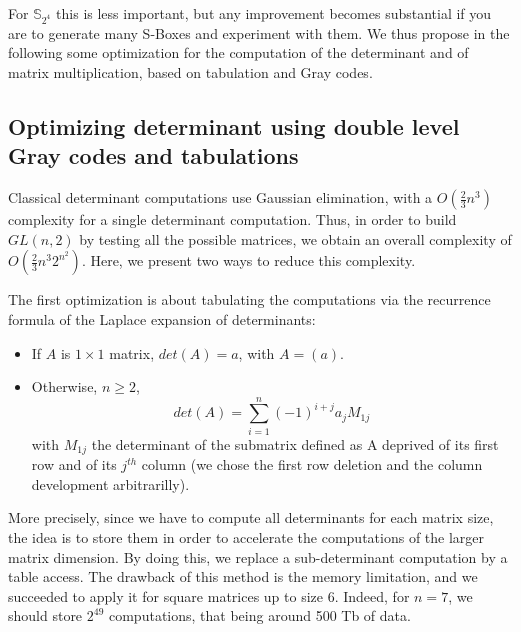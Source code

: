 \documentclass{article}\usepackage{amsthm}
\newcommand{\Sf}{{\mathbb S}}
\newcommand{\SBoxes}{S-Boxes\xspace}
\begin{document}
For $\Sf_{2^4}$ this is less important, but any improvement becomes substantial
if you are to generate many \SBoxes and experiment with them. We thus propose in
the following some optimization for the computation of the determinant and of
matrix multiplication, based on tabulation and Gray codes. 

\subsection{Optimizing determinant using double level Gray codes and tabulations}
Classical determinant computations use Gaussian elimination, with a $O(\frac{2}{3}n^3)$ complexity for a single determinant computation. 
Thus, in order to build $GL(n,2)$ by testing all the possible matrices, we obtain an overall complexity of $O(\frac{2}{3}n^3 2^{n^2})$. 
Here, we present two ways to reduce this complexity.

The first optimization is about tabulating the computations via the recurrence
formula of the Laplace expansion of determinants:
\begin{itemize}
	\item If $A$ is $1\times 1$ matrix, $det(A) = a$, with $A=(a)$.
	\item Otherwise, $n \ge 2$,  $$det(A) = \displaystyle \sum_{i=1}^n (-1)^{i+j}a_{j}M_{1j}$$ with $M_{1j}$ the determinant of the submatrix defined as A deprived of its first row and of its $j^{th}$ column (we chose the first row deletion and the column development arbitrarilly). 
\end{itemize}
		
		
More precisely, since we have to compute all determinants for each matrix size, the idea is to store them in order to accelerate the computations of the larger matrix dimension. 
By doing this, we replace a sub-determinant computation by a table access. The drawback of this method is the memory limitation, and we succeeded to apply it for square matrices up to size $6$. Indeed, for $n=7$, we should store $2^{49}$ computations, that being around 500 Tb of data. 
\end{document}
